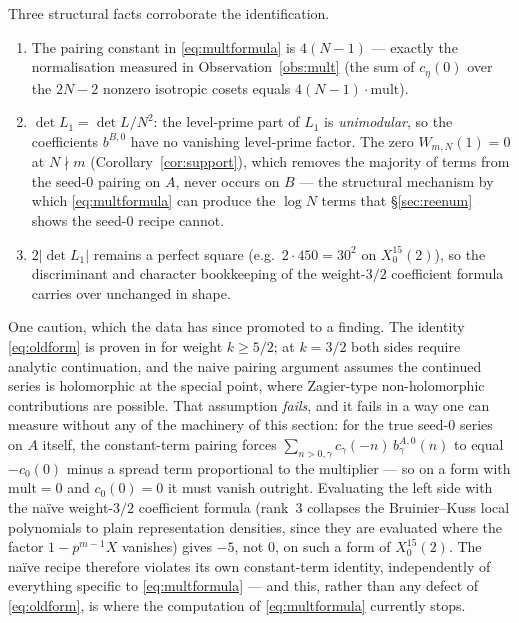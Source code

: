 \documentclass[11pt,reqno]{amsart}
\theoremstyle{plain}
\theoremstyle{definition}
\begin{document}
Three structural facts corroborate the identification.
\begin{enumerate}
\item The pairing constant in \eqref{eq:multformula} is $4(N-1)$ --- exactly the normalisation
      measured in Observation~\ref{obs:mult} (the sum of $c_\eta(0)$ over the $2N-2$ nonzero
      isotropic cosets equals $4(N-1)\cdot\mathrm{mult}$).
\item $\det L_1=\det L/N^2$: the level-prime part of $L_1$ is \emph{unimodular}, so the
      coefficients $b^{B,0}$ have no vanishing level-prime factor. The zero
      $W_{m,N}(1)=0$ at $N\nmid m$ (Corollary~\ref{cor:support}), which removes the majority of
      terms from the seed-$0$ pairing on $A$, never occurs on $B$ --- the structural mechanism by
      which \eqref{eq:multformula} can produce the $\log N$ terms that \S\ref{sec:reenum} shows
      the seed-$0$ recipe cannot.
\item $2\lvert\det L_1\rvert$ remains a perfect square (e.g.\ $2\cdot450=30^2$ on
      $X_0^{15}(2)$), so the discriminant and character bookkeeping of the weight-$3/2$
      coefficient formula carries over unchanged in shape.
\end{enumerate}

One caution, which the data has since promoted to a finding. The identity
\eqref{eq:oldform} is proven in \cite{Schwag} for weight $k\ge5/2$; at $k=3/2$ both sides require
analytic continuation, and the naive pairing argument assumes the continued series is holomorphic
at the special point, where Zagier-type non-holomorphic contributions are possible. That
assumption \emph{fails}, and it fails in a way one can measure without any of the machinery of
this section: for the true seed-$0$ series on $A$ itself, the constant-term pairing forces
$\sum_{n>0,\gamma}c_\gamma(-n)\,b^{A,0}_\gamma(n)$ to equal $-c_0(0)$ minus a spread term
proportional to the multiplier --- so on a form with $\mathrm{mult}=0$ and $c_0(0)=0$ it must
vanish outright. Evaluating the left side with the na\"ive weight-$3/2$ coefficient formula
(rank~$3$ collapses the Bruinier--Kuss local polynomials to plain representation densities, since
they are evaluated where the factor $1-p^{m-1}X$ vanishes) gives $-5$, not $0$, on such a form of
$X_0^{15}(2)$. The na\"ive recipe therefore violates its own constant-term identity,
independently of everything specific to \eqref{eq:multformula} --- and this, rather than any
defect of \eqref{eq:oldform}, is where the computation of \eqref{eq:multformula} currently stops.
\end{document}
